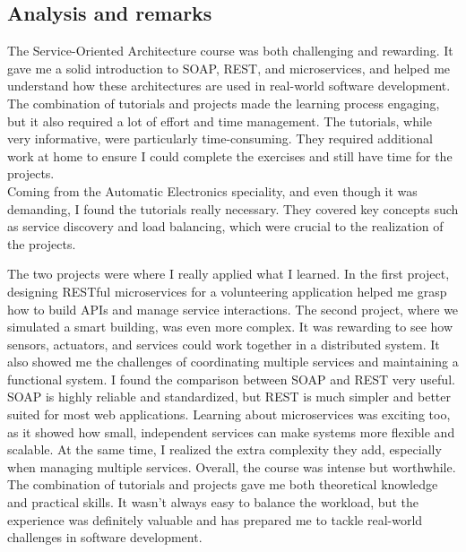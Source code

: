 \subsection{Analysis and remarks}

\indent \indent The Service-Oriented Architecture course was both challenging and rewarding. It gave me a solid introduction to SOAP, REST, and microservices, and helped me understand how these architectures are used in real-world software development. The combination of tutorials and projects made the learning process engaging, but it also required a lot of effort and time management.
\noindent The tutorials, while very informative, were particularly time-consuming. They required additional work at home to ensure I could complete the exercises and still have time for the projects.\\
Coming from the Automatic Electronics speciality, and even though it was demanding, I found the tutorials really necessary.  They covered key concepts such as service discovery and load balancing, which were crucial to the realization of the projects.
\vspace{0.25cm}

The two projects were where I really applied what I learned. In the first project, designing RESTful microservices for a volunteering application helped me grasp how to build APIs and manage service interactions. The second project, where we simulated a smart building, was even more complex. It was rewarding to see how sensors, actuators, and services could work together in a distributed system. It also showed me the challenges of coordinating multiple services and maintaining a functional system.
\noindent I found the comparison between SOAP and REST very useful. SOAP is highly reliable and standardized, but REST is much simpler and better suited for most web applications. Learning about microservices was exciting too, as it showed how small, independent services can make systems more flexible and scalable. At the same time, I realized the extra complexity they add, especially when managing multiple services.
\vspace{0.25cm}
\newpage
Overall, the course was intense but worthwhile. The combination of tutorials and projects gave me both theoretical knowledge and practical skills. It wasn't always easy to balance the workload, but the experience was definitely valuable and has prepared me to tackle real-world challenges in software development.
